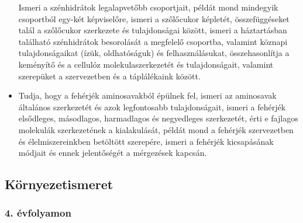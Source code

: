 \begin{itemize}
  Ismeri a szénhidrátok legalapvetőbb csoportjait, példát mond mindegyik
  csoportból egy-két képviselőre, ismeri a szőlőcukor képletét,
  összefüggéseket talál a szőlőcukor szerkezete és tulajdonságai között,
  ismeri a háztartásban található szénhidrátok besorolását a megfelelő
  csoportba, valamint köznapi tulajdonságaikat (ízük, oldhatóságuk) és
  felhasználásukat, összehasonlítja a keményítő és a cellulóz
  molekulaszerkezetét és tulajdonságait, valamint szerepüket a
  szervezetben és a táplálékaink között.
\item
  Tudja, hogy a fehérjék aminosavakból épülnek fel, ismeri az aminosavak
  általános szerkezetét és azok legfontosabb tulajdonságait, ismeri a
  fehérjék elsődleges, másodlagos, harmadlagos és negyedleges
  szerkezetét, érti e fajlagos molekulák szerkezetének a kialakulását,
  példát mond a fehérjék szervezetben és élelmiszereinkben betöltött
  szerepére, ismeri a fehérjék kicsapásának módjait és ennek
  jelentőségét a mérgezések kapcsán.
\end{itemize}

\hypertarget{kornyezetismeret}{%
\subsection{Környezetismeret}\label{kornyezetismeret}}

\hypertarget{evfolyamon-20}{%
\subsubsection{4. évfolyamon}\label{evfolyamon-20}}

